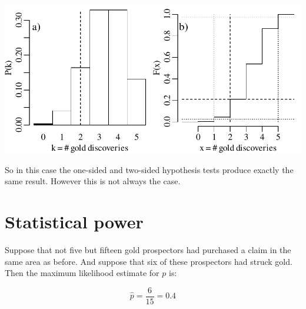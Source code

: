 \noindent\begin{minipage}[t][][b]{.6\textwidth}
  \includegraphics[width=\textwidth]{../figures/2sidedbinomialrejection5.pdf}\\
\end{minipage}
\begin{minipage}[t][][t]{.4\textwidth}
  \label{fig:2sidedbinomialrejection5}
\end{minipage}

So in this case the one-sided and two-sided hypothesis tests produce
exactly the same result. However this is not always the case.

\section{Statistical power}
\label{sec:power}

Suppose that not five but fifteen gold prospectors had purchased a
claim in the same area as before. And suppose that six of these
prospectors had struck gold. Then the maximum likelihood estimate for
$p$ is:

\[
\hat{p} = \frac{6}{15} = 0.4
\]

